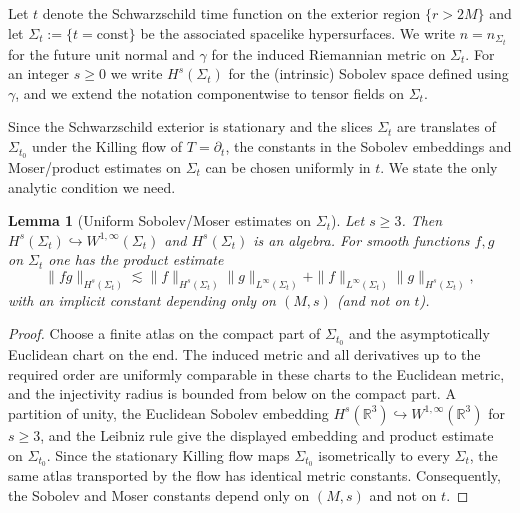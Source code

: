 \documentclass[11pt]{article}
\numberwithin{equation}{section}
\theoremstyle{plain}
\newtheorem{lemma}[theorem]{Lemma}
\theoremstyle{definition}
\theoremstyle{remark}
\begin{document}
Let $t$ denote the Schwarzschild time function on the exterior region $\{r>2M\}$ and let
$\Sigma_t:=\{t=\mathrm{const}\}$ be the associated spacelike hypersurfaces.
We write $n=n_{\Sigma_t}$ for the future unit normal and $\gamma$ for the induced Riemannian metric on $\Sigma_t$.
For an integer $s\ge 0$ we write $H^{s}(\Sigma_t)$ for the (intrinsic) Sobolev space defined using $\gamma$,
and we extend the notation componentwise to tensor fields on $\Sigma_t$.

Since the Schwarzschild exterior is stationary and the slices $\Sigma_t$ are translates of $\Sigma_{t_0}$ under the Killing flow of $T=\partial_t$,
the constants in the Sobolev embeddings and Moser/product estimates on $\Sigma_t$ can be chosen uniformly in $t$.
We state the only analytic condition we need.

\begin{lemma}[Uniform Sobolev/Moser estimates on $\Sigma_t$]\label{lem:sobolev-algebra-schwarzschild}
Let $s\ge 3$.
Then $H^{s}(\Sigma_t)\hookrightarrow W^{1,\infty}(\Sigma_t)$ and $H^{s}(\Sigma_t)$ is an algebra.
For smooth functions $f,g$ on $\Sigma_t$ one has the product estimate
\begin{equation}
\|fg\|_{H^{s}(\Sigma_t)}
\lesssim
\|f\|_{H^{s}(\Sigma_t)}\|g\|_{L^\infty(\Sigma_t)}
+\|f\|_{L^\infty(\Sigma_t)}\|g\|_{H^{s}(\Sigma_t)},
\end{equation}
with an implicit constant depending only on $(M,s)$ (and not on $t$).
\end{lemma}

\begin{proof}
Choose a finite atlas on the compact part of $\Sigma_{t_0}$ and the asymptotically Euclidean chart on the end.  The induced metric and all derivatives up to the required order are uniformly comparable in these charts to the Euclidean metric, and the injectivity radius is bounded from below on the compact part.  A partition of unity, the Euclidean Sobolev embedding $H^s(\mathbb R^3)\hookrightarrow W^{1,\infty}(\mathbb R^3)$ for $s\ge3$, and the Leibniz rule give the displayed embedding and product estimate on $\Sigma_{t_0}$.  Since the stationary Killing flow maps $\Sigma_{t_0}$ isometrically to every $\Sigma_t$, the same atlas transported by the flow has identical metric constants.  Consequently, the Sobolev and Moser constants depend only on $(M,s)$ and not on $t$.
\end{proof}
\end{document}
